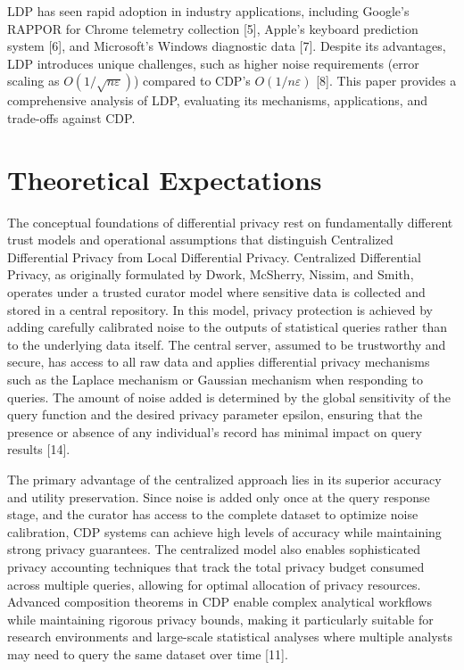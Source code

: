 \documentclass[conference]{IEEEtran}
\begin{document}
LDP has seen rapid adoption in industry applications, including Google's RAPPOR for Chrome telemetry collection [5], Apple's keyboard prediction system [6], and Microsoft's Windows diagnostic data [7]. Despite its advantages, LDP introduces unique challenges, such as higher noise requirements (error scaling as $O(1/\sqrt{n\varepsilon})$) compared to CDP's $O(1/n\varepsilon)$ [8]. This paper provides a comprehensive analysis of LDP, evaluating its mechanisms, applications, and trade-offs against CDP.

\section{Theoretical Expectations}

The conceptual foundations of differential privacy rest on fundamentally different trust models and operational assumptions that distinguish Centralized Differential Privacy from Local Differential Privacy. Centralized Differential Privacy, as originally formulated by Dwork, McSherry, Nissim, and Smith, operates under a trusted curator model where sensitive data is collected and stored in a central repository. In this model, privacy protection is achieved by adding carefully calibrated noise to the outputs of statistical queries rather than to the underlying data itself. The central server, assumed to be trustworthy and secure, has access to all raw data and applies differential privacy mechanisms such as the Laplace mechanism or Gaussian mechanism when responding to queries. The amount of noise added is determined by the global sensitivity of the query function and the desired privacy parameter epsilon, ensuring that the presence or absence of any individual's record has minimal impact on query results [14].

The primary advantage of the centralized approach lies in its superior accuracy and utility preservation. Since noise is added only once at the query response stage, and the curator has access to the complete dataset to optimize noise calibration, CDP systems can achieve high levels of accuracy while maintaining strong privacy guarantees. The centralized model also enables sophisticated privacy accounting techniques that track the total privacy budget consumed across multiple queries, allowing for optimal allocation of privacy resources. Advanced composition theorems in CDP enable complex analytical workflows while maintaining rigorous privacy bounds, making it particularly suitable for research environments and large-scale statistical analyses where multiple analysts may need to query the same dataset over time [11].
\end{document}
